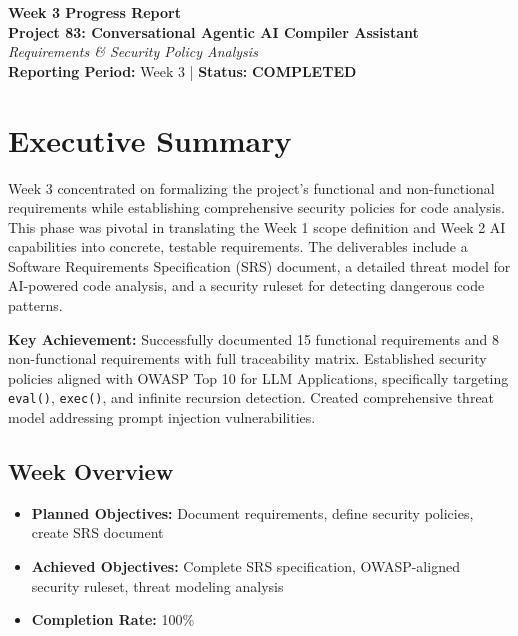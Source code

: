 \documentclass[a4paper,11pt]{article}
\newcommand{\statusgood}[1]{\colorbox{green!20}{\textbf{#1}}}
\begin{document}
\begin{center}
    {\huge \textbf{Week 3 Progress Report}} \\
    \vspace{3mm}
    {\large \textbf{Project 83: Conversational Agentic AI Compiler Assistant}} \\
    \vspace{2mm}
    \textit{Requirements \& Security Policy Analysis} \\
    \vspace{2mm}
    \textbf{Reporting Period:} Week 3 | \textbf{Status:} \statusgood{COMPLETED}
\end{center}

\vspace{5mm}

\section{Executive Summary}

Week 3 concentrated on formalizing the project's functional and non-functional requirements while establishing comprehensive security policies for code analysis. This phase was pivotal in translating the Week 1 scope definition and Week 2 AI capabilities into concrete, testable requirements. The deliverables include a Software Requirements Specification (SRS) document, a detailed threat model for AI-powered code analysis, and a security ruleset for detecting dangerous code patterns.

\textbf{Key Achievement:} Successfully documented 15 functional requirements and 8 non-functional requirements with full traceability matrix. Established security policies aligned with OWASP Top 10 for LLM Applications, specifically targeting \texttt{eval()}, \texttt{exec()}, and infinite recursion detection. Created comprehensive threat model addressing prompt injection vulnerabilities.

\subsection{Week Overview}

\begin{itemize}[leftmargin=*]
    \item \textbf{Planned Objectives:} Document requirements, define security policies, create SRS document
    \item \textbf{Achieved Objectives:} Complete SRS specification, OWASP-aligned security ruleset, threat modeling analysis
    \item \textbf{Completion Rate:} 100\%
\end{itemize}
\end{document}
